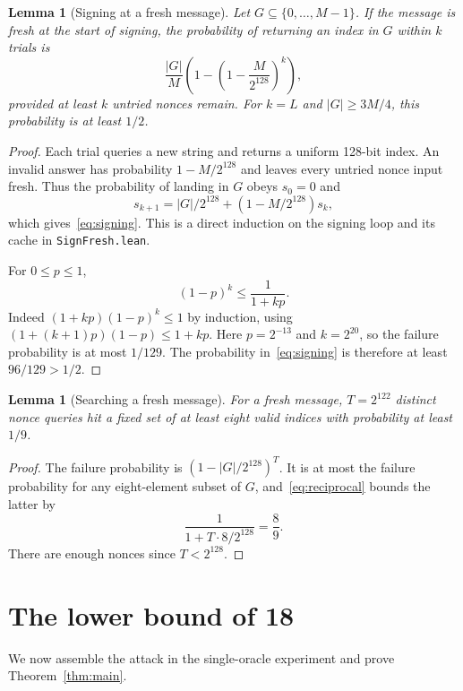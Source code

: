 \documentclass[10pt]{article}
\newtheorem{lemma}[theorem]{Lemma}
\begin{document}
\begin{lemma}[Signing at a fresh message]\label{lem:signing}
Let $G\subseteq\{0,\ldots,M-1\}$. If the message is fresh at the start of signing, the probability of returning an index in $G$ within $k$ trials is
\begin{equation}\label{eq:signing}
\frac{|G|}{M}\left(1-\left(1-\frac{M}{2^{128}}\right)^k\right),
\end{equation}
provided at least $k$ untried nonces remain. For $k=L$ and $|G|\ge3M/4$, this probability is at least $1/2$.
\end{lemma}
\begin{proof}
Each trial queries a new string and returns a uniform 128-bit index. An invalid answer has probability $1-M/2^{128}$ and leaves every untried nonce input fresh. Thus the probability of landing in $G$ obeys $s_0=0$ and
\[
s_{k+1}=|G|/2^{128}+(1-M/2^{128})s_k,
\]
which gives~\eqref{eq:signing}. This is a direct induction on the signing loop and its cache in \texttt{SignFresh.lean}.

For $0\le p\le1$,
\begin{equation}\label{eq:reciprocal}
(1-p)^k\le\frac1{1+kp}.
\end{equation}
Indeed $(1+kp)(1-p)^k\le1$ by induction, using
$(1+(k+1)p)(1-p)\le1+kp$. Here $p=2^{-13}$ and $k=2^{20}$, so the failure probability is at most $1/129$. The probability in~\eqref{eq:signing} is therefore at least $96/129>1/2$.
\end{proof}

\begin{lemma}[Searching a fresh message]\label{lem:search}
For a fresh message, $T=2^{122}$ distinct nonce queries hit a fixed set of at least eight valid indices with probability at least $1/9$.
\end{lemma}
\begin{proof}
The failure probability is $(1-|G|/2^{128})^T$. It is at most the failure probability for any eight-element subset of $G$, and~\eqref{eq:reciprocal} bounds the latter by
\[
\frac1{1+T\cdot8/2^{128}}=\frac89.
\]
There are enough nonces since $T<2^{128}$.
\end{proof}

\section{The lower bound of 18}\label{sec:attack}

We now assemble the attack in the single-oracle experiment and prove Theorem~\ref{thm:main}.
\end{document}
